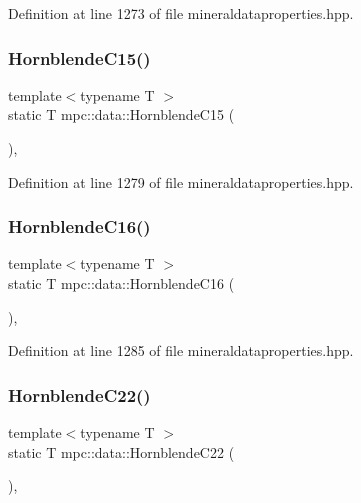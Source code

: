 Definition at line 1273 of file mineraldataproperties.\+hpp.

\mbox{\label{namespacempc_1_1data_aaeeb354c630ab65b130e13d60dd76cfb}} 
\subsubsection{\texorpdfstring{Hornblende\+C15()}{HornblendeC15()}}
{\footnotesize\ttfamily template$<$typename T $>$ \\
static T mpc\+::data\+::\+Hornblende\+C15 (\begin{DoxyParamCaption}{ }\end{DoxyParamCaption})\hspace{0.3cm}{\ttfamily [inline]}, {\ttfamily [static]}}



Definition at line 1279 of file mineraldataproperties.\+hpp.

\mbox{\label{namespacempc_1_1data_a08677cb0d405354a51f2e08572e9cad6}} 
\subsubsection{\texorpdfstring{Hornblende\+C16()}{HornblendeC16()}}
{\footnotesize\ttfamily template$<$typename T $>$ \\
static T mpc\+::data\+::\+Hornblende\+C16 (\begin{DoxyParamCaption}{ }\end{DoxyParamCaption})\hspace{0.3cm}{\ttfamily [inline]}, {\ttfamily [static]}}



Definition at line 1285 of file mineraldataproperties.\+hpp.

\mbox{\label{namespacempc_1_1data_ad6d385e755bc529d6357515c8d357ee2}} 
\subsubsection{\texorpdfstring{Hornblende\+C22()}{HornblendeC22()}}
{\footnotesize\ttfamily template$<$typename T $>$ \\
static T mpc\+::data\+::\+Hornblende\+C22 (\begin{DoxyParamCaption}{ }\end{DoxyParamCaption})\hspace{0.3cm}{\ttfamily [inline]}, {\ttfamily [static]}}



